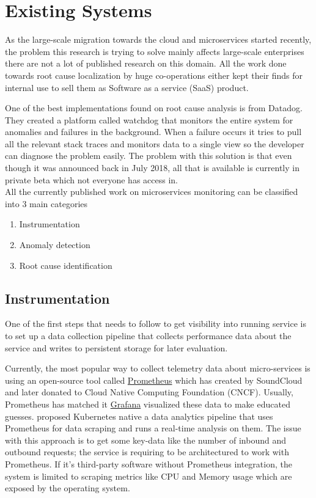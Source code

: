 \section{Existing Systems}

As the large-scale migration towards the cloud and microservices started recently, the problem this research is trying to solve mainly affects large-scale enterprises there are not a lot of published research on this domain. All the work done towards root cause localization by huge co-operations either kept their finds for internal use to sell them as Software as a service
 (SaaS) product. 

One of the best implementations found on root cause analysis is from Datadog. They created a platform called watchdog \citep{Watchdog76:online} that monitors the entire system for anomalies and failures in the background. When a failure occurs it tries to pull all the relevant stack traces and monitors data to a single view so the developer can diagnose the problem easily. The problem with this solution is that even though it was announced back in July 2018, all that is available is currently in private beta which not everyone has access in.
\\
All the currently published work on microservices monitoring can be classified into 3 main categories
\begin{enumerate} 
\item Instrumentation
\item Anomaly detection
\item Root cause identification
\end{enumerate}

\subsection{Instrumentation}
One of the first steps that needs to follow to get visibility into running service is to set up a data collection pipeline that collects performance data about the service and writes to persistent storage for later evaluation. 

Currently, the most popular way to collect telemetry data about micro-services is using an open-source tool called \href{https://prometheus.io/}{Prometheus} which has created by SoundCloud and later donated to Cloud Native Computing Foundation (CNCF). Usually, Prometheus has matched it \href{https://grafana.com/}{Grafana} visualized these data to make educated guesses. \cite{toka2021predicting} proposed Kubernetes native a data analytics pipeline that uses Prometheus for data scraping and runs a real-time analysis on them. The issue with this approach is to get some key-data like the number of inbound and outbound requests; the service is requiring to be architectured to work with Prometheus. If it's third-party software without Prometheus integration, the system is limited to scraping metrics like CPU and Memory usage which are exposed by the operating system.


